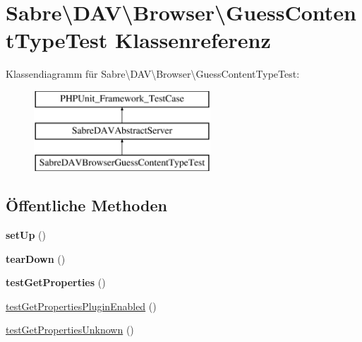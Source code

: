\hypertarget{class_sabre_1_1_d_a_v_1_1_browser_1_1_guess_content_type_test}{}\section{Sabre\textbackslash{}D\+AV\textbackslash{}Browser\textbackslash{}Guess\+Content\+Type\+Test Klassenreferenz}
\label{class_sabre_1_1_d_a_v_1_1_browser_1_1_guess_content_type_test}
Klassendiagramm für Sabre\textbackslash{}D\+AV\textbackslash{}Browser\textbackslash{}Guess\+Content\+Type\+Test\+:\begin{figure}[H]
\begin{center}
\leavevmode
\includegraphics[height=3.000000cm]{class_sabre_1_1_d_a_v_1_1_browser_1_1_guess_content_type_test}
\end{center}
\end{figure}
\subsection*{Öffentliche Methoden}
\begin{DoxyCompactItemize}
\item 
\mbox{\label{class_sabre_1_1_d_a_v_1_1_browser_1_1_guess_content_type_test_aab18ed7b07dc1fa66e5087d4980bcc4b}} 
{\bfseries set\+Up} ()
\item 
\mbox{\label{class_sabre_1_1_d_a_v_1_1_browser_1_1_guess_content_type_test_a12680db5026adf9193d2ef392b81f7cd}} 
{\bfseries tear\+Down} ()
\item 
\mbox{\label{class_sabre_1_1_d_a_v_1_1_browser_1_1_guess_content_type_test_a3e5f8498885bd6d1f7836db6a2791be3}} 
{\bfseries test\+Get\+Properties} ()
\item 
\mbox{\hyperlink{class_sabre_1_1_d_a_v_1_1_browser_1_1_guess_content_type_test_a564e9a1a5f79810bd375c2f49ea40e73}{test\+Get\+Properties\+Plugin\+Enabled}} ()
\item 
\mbox{\hyperlink{class_sabre_1_1_d_a_v_1_1_browser_1_1_guess_content_type_test_a63bf28d7417f15fb931eb264869e05cd}{test\+Get\+Properties\+Unknown}} ()
\end{DoxyCompactItemize}
